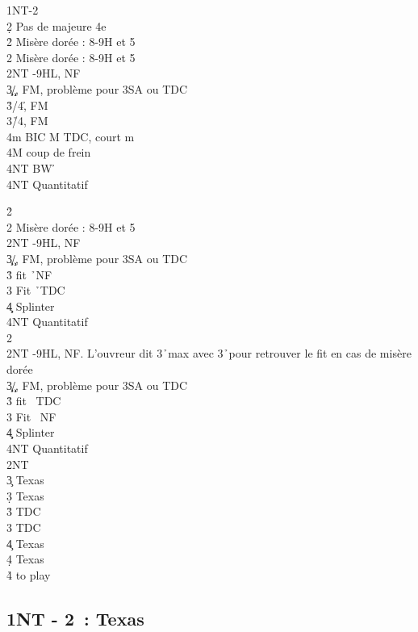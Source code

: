 \documentclass[a4paper]{article}
\begin{document}
\begin{bidtable}
1NT-2\c\\
2\d \> Pas de majeure 4e\+\\
2\h \> Misère dorée : 8-9H et 5\h \\
2\s \> Misère dorée : 8-9H et 5\s \\
2NT -9HL, NF\\
3\c\d {}\c /\d , FM, problème pour 3SA ou TDC\\
3\h {}\s /4\h , FM\\
3\s {}\h /4\s , FM\\
4m \> BIC M TDC, court m\+\\
4M \> coup de frein\\
4NT \> BW \h \-\\
4NT \> Quantitatif\-
\end{bidtable}

\begin{bidtable}
2\h\+\\
2\s \> Misère dorée : 8-9H et 5\s \\
2NT -9HL, NF\\
3\c\d {}\c /\d , FM, problème pour 3SA ou TDC\\
3\h \> fit \h\ NF\\
3\s \> Fit \h\ TDC\\
4\c\d \> Splinter\\
4NT \> Quantitatif\-\\
2\s\+\\
2NT -9HL, NF. L'ouvreur dit 3\h\ max avec 3\h\ pour retrouver le fit en cas de misère dorée\\
3\c\d {}\c /\d , FM, problème pour 3SA ou TDC\\
3\h \> fit \s\ TDC\\
3\s \> Fit \s\ NF\\
4\c\d \> Splinter\\
4NT \> Quantitatif\-\\
2NT\+\\
3\c \> Texas \h \\
3\d \> Texas \s \\
3\h \> TDC\\
3\s \> TDC\\
4\c \> Texas \h \\
4\d \> Texas \s \\
4\h\s \> to play\-
\end{bidtable}

\subsection{1NT - 2\pdfd\ : Texas \pdfh}
\end{document}

